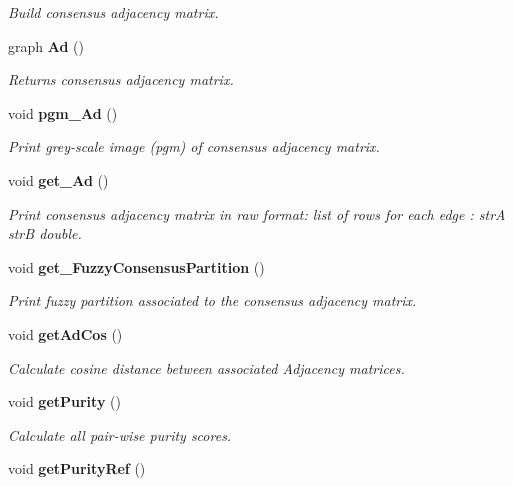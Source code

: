 \begin{CompactItemize}
\begin{CompactList}\small\item\em Build consensus adjacency matrix. \item\end{CompactList}\item 
graph {\bf Ad} ()\label{classPartitionStats_a17}

\begin{CompactList}\small\item\em Returns consensus adjacency matrix. \item\end{CompactList}\item 
void {\bf pgm\_\-Ad} ()\label{classPartitionStats_a18}

\begin{CompactList}\small\item\em Print grey-scale image (pgm) of consensus adjacency matrix. \item\end{CompactList}\item 
void {\bf get\_\-Ad} ()\label{classPartitionStats_a19}

\begin{CompactList}\small\item\em Print consensus adjacency matrix in raw format: list of rows for each edge : str\-A str\-B double. \item\end{CompactList}\item 
void {\bf get\_\-Fuzzy\-Consensus\-Partition} ()\label{classPartitionStats_a20}

\begin{CompactList}\small\item\em Print fuzzy partition associated to the consensus adjacency matrix. \item\end{CompactList}\item 
void {\bf get\-Ad\-Cos} ()\label{classPartitionStats_a21}

\begin{CompactList}\small\item\em Calculate cosine distance between associated Adjacency matrices. \item\end{CompactList}\item 
void {\bf get\-Purity} ()\label{classPartitionStats_a22}

\begin{CompactList}\small\item\em Calculate all pair-wise purity scores. \item\end{CompactList}\item 
void {\bf get\-Purity\-Ref} ()\label{classPartitionStats_a23}


\end{CompactItemize}
